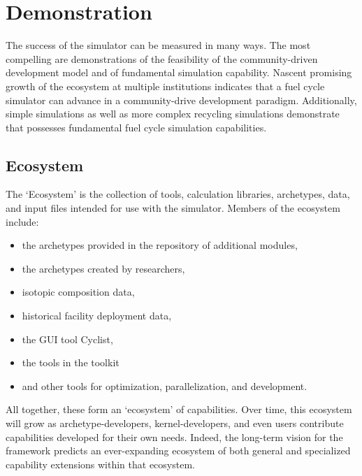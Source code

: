 \section{Demonstration}
%

%


The success of the \Cyclus simulator can be measured in many ways. 
The most compelling are demonstrations of the feasibility of the \Cyclus community-driven development 
model and of fundamental simulation capability. Nascent promising growth of the \Cyclus 
ecosystem at multiple institutions indicates that a fuel cycle simulator can 
advance in a community-drive development paradigm. Additionally, simple 
simulations as well as more complex recycling simulations demonstrate that 
\Cyclus possesses fundamental fuel cycle simulation capabilities.

\subsection{Ecosystem}

The \Cyclus `Ecosystem' is the collection of tools, calculation libraries, 
archetypes, data, and input files intended for use with the \Cyclus simulator. 
Members of the ecosystem include:
\begin{itemize}
\item the archetypes provided in the \Cycamore \cite{carlsen_cycamore_2014} 
repository of additional modules,
\item the archetypes created by researchers,
\item isotopic composition data,
\item historical facility deployment data,
\item the \Cyclus \gls{GUI} tool Cyclist,
\item the tools in the \Cyclus toolkit
\item and other tools for \Cyclus optimization, parallelization, and development.
\end{itemize}
All together, these form an `ecosystem' of capabilities. Over time, this 
ecosystem will grow as archetype-developers, kernel-developers, and 
even users contribute capabilities developed for their own needs. Indeed, the 
long-term vision for the \Cyclus framework predicts an ever-expanding ecosystem 
of both general and specialized capability extensions within that ecosystem. 

